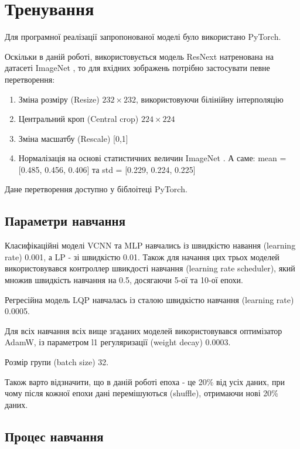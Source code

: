 \documentclass{udstu}
\begin{document}
\clearpage


\section{Тренування}

Для програмної реалізації запропонованої моделі було використано PyTorch.

Оскільки в даній роботі, використовується модель ResNext \cite{resnext} натренована
на датасеті ImageNet \cite{deng2009imagenet}, то для вхідних зображень потрібно
застосувати певне перетворення:

\begin{enumerate}[1)]
	\item Зміна розміру (Resize) $232 \times 232$,
	використовуючи білінійну інтерполяцію
	\item Центральний кроп (Central crop) $224 \times 224$
	\item Зміна масшатбу (Rescale) [0,1]
	\item Нормалізація на основі статистичних величин ImageNet \cite{deng2009imagenet}.
	А саме: mean = [0.485, 0.456, 0.406] та std = [0.229, 0.224, 0.225]
\end{enumerate}

Дане перетворення доступно у біблоітеці PyTorch.


\subsection{Параметри навчання}

Класифікаційні моделі VCNN та MLP навчались із
швидкістю навання (learning rate) 0.001, а LP - зі швидкістю 0.01.
Також для начання цих трьох моделей використовувався контроллер швикдості навчання
(learning rate scheduler), який множив швидкість навчання на 0.5, досягаючи
5-ої та 10-ої епохи.

Регресійна модель LQP навчалась із сталою швидкістю навчання (learning rate) 0.0005.

Для всіх навчання всіх вище згаданих моделей використовувався оптимізатор
AdamW, із параметром l1 регуляризації (weight decay) 0.0003.

Розмір групи (batch size) 32.

Також варто відзначити, що в даній роботі епоха - це 20\% від усіх даних,
при чому після кожної епохи дані перемішуються (shuffle), отримаючи
нові 20\% даних.


\subsection{Процес навчання}
\end{document}
